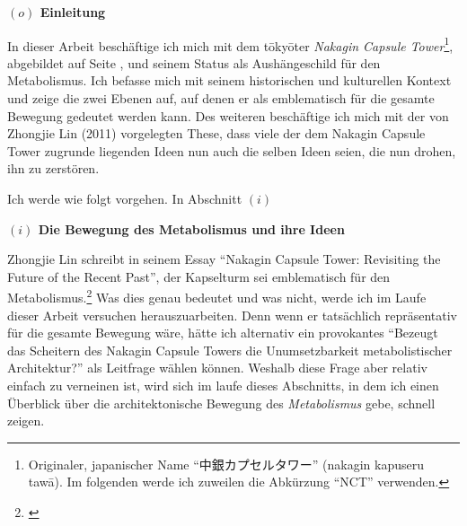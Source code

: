 \documentclass[a4paper, 12pt]{article}
\begin{document}
\begin{onehalfspace} 

\noindent\textbf{$(o)$ Einleitung}

\noindent In dieser Arbeit beschäftige ich mich mit dem tōkyōter \emph{Nakagin Capsule Tower}\footnote{Originaler, japanischer Name "`中銀カプセルタワー"' (nakagin kapuseru tawā). Im folgenden werde ich zuweilen die Abkürzung "`NCT"' verwenden.}, abgebildet auf Seite \pageref{fig:tawa}, und seinem Status als Aushängeschild für den Metabolismus. Ich befasse mich mit seinem historischen und kulturellen Kontext und zeige die zwei Ebenen auf, auf denen er als emblematisch für die gesamte Bewegung gedeutet werden kann. Des weiteren beschäftige ich mich mit der von Zhongjie Lin (2011) vorgelegten These, dass viele der dem Nakagin Capsule Tower zugrunde liegenden Ideen nun auch die selben Ideen seien, die nun drohen, ihn zu zerstören. 

 

\vspace{3mm}

Ich werde wie folgt vorgehen. In Abschnitt $(i)$ 

\vspace{5mm}
\noindent\textbf{$(i)$ Die Bewegung des Metabolismus und ihre Ideen} %

\noindent Zhongjie Lin schreibt in seinem Essay "`Nakagin Capsule Tower: Revisiting the Future of the Recent Past"', der Kapselturm sei emblematisch für den Metabolismus.\footnote{\Cite[Siehe][S. 243]{gleiter}} Was dies genau bedeutet und was nicht, werde ich im Laufe dieser Arbeit versuchen herauszuarbeiten. Denn wenn er tatsächlich repräsentativ für die gesamte Bewegung wäre, hätte ich alternativ ein provokantes "`Bezeugt das Scheitern des Nakagin Capsule Towers die Unumsetzbarkeit metabolistischer Architektur?"' als Leitfrage wählen können. Weshalb diese Frage aber relativ einfach zu verneinen ist, wird sich im laufe dieses Abschnitts, in dem ich einen Überblick über die architektonische Bewegung des \emph{Metabolismus} gebe, schnell zeigen.


\end{onehalfspace}
\end{document}
